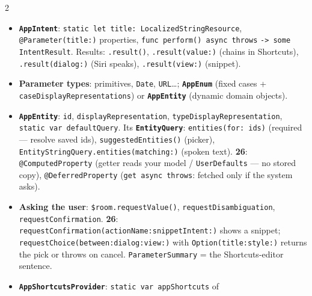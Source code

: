 \documentclass[8pt]{extarticle}
\newcommand\ct[1]{\texttt{#1}}
\newcommand\arr{\texttt{\hbox{-}\hbox{>}}}
\newcommand\hd[1]{\par\vspace{3pt}\noindent{\bfseries\color{sheetBlue}#1}\par\vspace{1pt}}
\newcommand\vv[1]{\textcolor{sheetOrange}{\textbf{#1}}}
\begin{document}



\begin{multicols}{2}
\footnotesize{}\raggedright

\hd{How it works}
\begin{itemize}
  \item \textbf{\texttt{AppIntent}}: \ct{static let title: LocalizedStringResource},
        \ct{@Parameter(title:)} properties, \ct{func perform() async throws} \arr\
        \ct{some IntentResult}. Results: \ct{.result()}, \ct{.result(value:)} (chains in Shortcuts),
        \ct{.result(dialog:)} (Siri speaks), \ct{.result(view:)} (snippet).
  \item \textbf{Parameter types}: primitives, \ct{Date}, \ct{URL}\ldots;
        \textbf{\ct{AppEnum}} (fixed cases + \ct{caseDisplayRepresentations})
        or \textbf{\ct{AppEntity}} (dynamic domain objects).
  \item \textbf{\ct{AppEntity}}: \ct{id}, \ct{displayRepresentation},
        \ct{typeDisplayRepresentation}, \ct{static var defaultQuery}. Its
        \textbf{\ct{EntityQuery}}: \ct{entities(for: ids)} (required — resolve saved ids),
        \ct{suggestedEntities()} (picker), \ct{EntityStringQuery.entities(matching:)} (spoken text).
        \vv{26}: \ct{@ComputedProperty} (getter reads your model / \ct{UserDefaults} — no stored
        copy), \ct{@DeferredProperty} (\ct{get async throws}: fetched only if the system asks).
  \item \textbf{Asking the user}: \ct{\$room.requestValue()}, \ct{requestDisambiguation},
        \ct{requestConfirmation}. \vv{26}: \ct{requestConfirmation(actionName:snippetIntent:)} shows a
        snippet; \ct{requestChoice(between:dialog:view:)} with \ct{Option(title:style:)} returns the
        pick or throws on cancel. \ct{ParameterSummary} = the Shortcuts-editor sentence.
  \item \textbf{\ct{AppShortcutsProvider}}: \ct{static var appShortcuts} of

\end{itemize}
\end{multicols}
\end{document}
